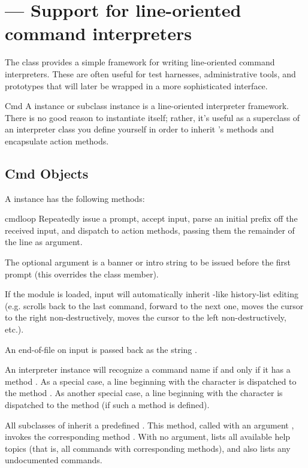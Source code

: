 \section{ ---
         Support for line-oriented command interpreters}



The  class provides a simple framework for writing
line-oriented command interpreters.  These are often useful for
test harnesses, administrative tools, and prototypes that will
later be wrapped in a more sophisticated interface.

\begin{classdesc}{Cmd}{}
A  instance or subclass instance is a line-oriented
interpreter framework.  There is no good reason to instantiate
 itself; rather, it's useful as a superclass of an
interpreter class you define yourself in order to inherit
's methods and encapsulate action methods.
\end{classdesc}

\subsection{Cmd Objects}
\label{Cmd-objects}

A  instance has the following methods:

\begin{methoddesc}{cmdloop}{}
Repeatedly issue a prompt, accept input, parse an initial prefix off
the received input, and dispatch to action methods, passing them the
remainder of the line as argument.

The optional argument is a banner or intro string to be issued before the
first prompt (this overrides the  class member).

If the  module is loaded, input will automatically
inherit -like history-list editing (e.g. 
scrolls back to the last command,  forward to the next
one,  moves the cursor to the right non-destructively,
 moves the cursor to the left non-destructively, etc.).

An end-of-file on input is passed back as the string .

An interpreter instance will recognize a command name  if
and only if it has a method .  As a special case,
a line beginning with the character  is dispatched to
the method .  As another special case, a line
beginning with the character \character{!} is dispatched to the
method  (if such a method is defined).

All subclasses of  inherit a predefined .
This method, called with an argument , invokes the
corresponding method .  With no argument,
 lists all available help topics (that is, all
commands with corresponding  methods), and also lists
any undocumented commands.
\end{methoddesc}

